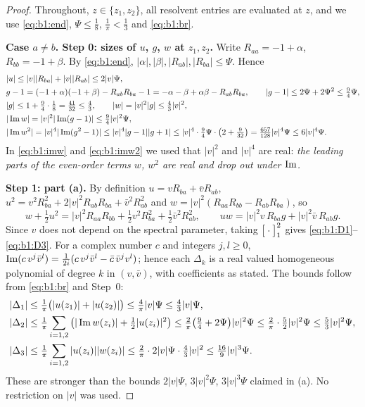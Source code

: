 \begin{proof}
Throughout, $z\in\{z_1,z_2\}$, all resolvent entries are evaluated at $z$, and we use \eqref{eq:b1:end}, $\Psi\le\frac18$, $\frac1\pi<\frac13$ and \eqref{eq:b1:br}.

\medskip\noindent\textbf{Case $a\ne b$. Step 0: sizes of $u$, $g$, $w$ at $z_1,z_2$.} Write $R_{aa}=-1+\alpha$, $R_{bb}=-1+\beta$. By \eqref{eq:b1:end},
$|\alpha|,|\beta|,|R_{ab}|,|R_{ba}|\le\Psi$. Hence
\begin{align}
&|u|\le|v||R_{ba}|+|v||R_{ab}|\le2|v|\Psi,\label{eq:b1:u}\\
&g-1=(-1+\alpha)(-1+\beta)-R_{ab}R_{ba}-1=-\alpha-\beta+\alpha\beta-R_{ab}R_{ba},\qquad|g-1|\le2\Psi+2\Psi^2\le\tfrac94\Psi,\label{eq:b1:g}\\
&|g|\le1+\tfrac94\cdot\tfrac18=\tfrac{41}{32}\le\tfrac43,\qquad|w|=|v|^2|g|\le\tfrac43|v|^2,\label{eq:b1:w}\\
&|\operatorname{Im} w|=|v|^2|\operatorname{Im}(g-1)|\le\tfrac94|v|^2\Psi,\label{eq:b1:imw}\\
&|\operatorname{Im} w^2|=|v|^4|\operatorname{Im}(g^2-1)|\le|v|^4|g-1||g+1|\le|v|^4\cdot\tfrac94\Psi\cdot\big(2+\tfrac9{32}\big)=\tfrac{657}{128}|v|^4\Psi\le6|v|^4\Psi .\label{eq:b1:imw2}
\end{align}
In \eqref{eq:b1:imw} and \eqref{eq:b1:imw2} we used that $|v|^2$ and $|v|^4$ are real: \emph{the leading parts of the even-order terms $w$, $w^2$ are real and drop
out under $\operatorname{Im}$.}

\medskip\noindent\textbf{Step 1: part (a).} By definition $u=vR_{ba}+\bar vR_{ab}$, $u^2=v^2R_{ba}^2+2|v|^2R_{ab}R_{ba}+\bar v^2R_{ab}^2$ and
$w=|v|^2(R_{aa}R_{bb}-R_{ab}R_{ba})$, so
\[
w+\tfrac12u^2=|v|^2R_{aa}R_{bb}+\tfrac12v^2R_{ba}^2+\tfrac12\bar v^2R_{ab}^2,\qquad uw=|v|^2v\,R_{ba}g+|v|^2\bar v\,R_{ab}g .
\]
Since $v$ does not depend on the spectral parameter, taking $\big[\cdot\big]_{1}^{2}$ gives \eqref{eq:b1:D1}--\eqref{eq:b1:D3}. For a complex number $c$ and integers
$j,l\ge0$, $\operatorname{Im}(c\,v^j\bar v^l)=\frac1{2i}(c\,v^j\bar v^l-\bar c\,\bar v^jv^l)$; hence each $\Delta_k$ is a real valued homogeneous polynomial of degree $k$ in
$(v,\bar v)$, with coefficients as stated. The bounds follow from \eqref{eq:b1:br} and Step~0:
\begin{align}
|\Delta_1|&\le\tfrac1\pi\big(|u(z_1)|+|u(z_2)|\big)\le\tfrac4\pi|v|\Psi\le\tfrac43|v|\Psi,\label{eq:b1:bD1}\\
|\Delta_2|&\le\tfrac1\pi\sum_{i=1,2}\big(|\operatorname{Im} w(z_i)|+\tfrac12|u(z_i)|^2\big)\le\tfrac2\pi\big(\tfrac94+2\Psi\big)|v|^2\Psi\le\tfrac2\pi\cdot\tfrac52|v|^2\Psi\le\tfrac53|v|^2\Psi,\label{eq:b1:bD2}\\
|\Delta_3|&\le\tfrac1\pi\sum_{i=1,2}|u(z_i)||w(z_i)|\le\tfrac2\pi\cdot2|v|\Psi\cdot\tfrac43|v|^2\le\tfrac{16}9|v|^3\Psi .\label{eq:b1:bD3}
\end{align}
These are stronger than the bounds $2|v|\Psi$, $3|v|^2\Psi$, $3|v|^3\Psi$ claimed in (a). No restriction on $|v|$ was used.


\end{proof}
